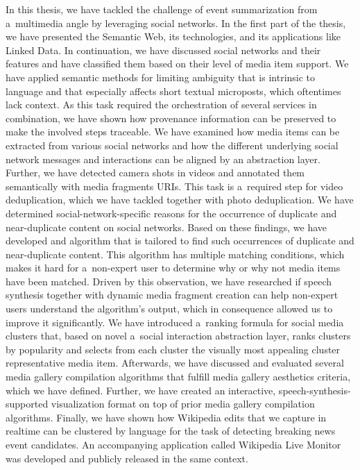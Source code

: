 In this thesis, we have tackled the challenge of event summarization
from a~multimedia angle by leveraging social networks.
In the first part of the thesis,
we have presented the Semantic Web,
its technologies, and its applications like Linked Data.
In continuation, we have discussed social networks
and their features and have classified them
based on their level of media item support.
We have applied semantic methods for limiting ambiguity
that is intrinsic to language and that especially affects
short textual microposts, which oftentimes lack context.
As this task required the orchestration of several services
in combination, we have shown how provenance information
can be preserved to make the involved steps traceable.
We have examined how media items can be extracted from 
various social networks and how the different
underlying social network messages and interactions
can be aligned by an abstraction layer.
Further, we have detected camera shots in videos and 
annotated them semantically with media fragments URIs.
This task is a~required step for video deduplication,
which we have tackled together with photo deduplication.
We have determined social-network-specific reasons
for the occurrence of duplicate and near-duplicate content
on social networks.
Based on these findings, we have developed and algorithm
that is tailored to find such occurrences of duplicate
and near-duplicate content.
This algorithm has multiple matching conditions,
which makes it hard for a~non-expert user to determine
why or why not media items have been matched.
Driven by this observation, we have researched
if speech synthesis together with dynamic media fragment creation
can help non-expert users understand the algorithm's output,
which in consequence allowed us to improve it significantly.
We have introduced a~ranking formula for social media clusters
that, based on novel a~social interaction abstraction layer,
ranks clusters by popularity and selects from each cluster
the visually most appealing cluster representative media item.
Afterwards, we have discussed and evaluated several
media gallery compilation algorithms
that fulfill media gallery aesthetics criteria,
which we have defined.
Further, we have created an interactive,
speech-synthesis-supported visualization format
on top of prior media gallery compilation algorithms.
Finally, we have shown how Wikipedia edits
that we capture in realtime can be clustered by language
for the task of detecting breaking news event candidates.
An accompanying application called Wikipedia Live Monitor
was developed and publicly released in the same context.

